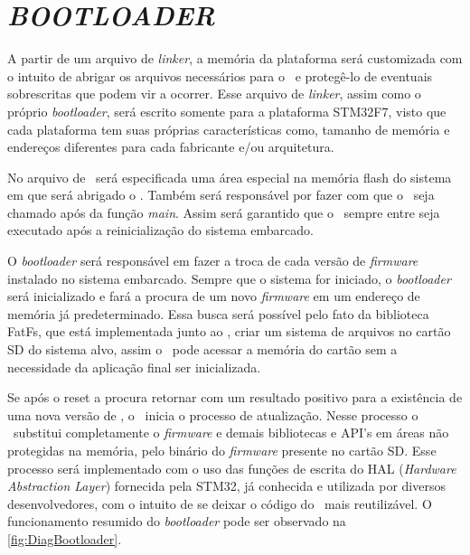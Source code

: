 \section{\textit{BOOTLOADER}}
\label{sec:Bootloader}

A partir de um arquivo de \textit{linker}, a memória da plataforma será customizada com o intuito de abrigar os arquivos necessários para o \bootloader\ e protegê-lo de eventuais sobrescritas que podem vir a ocorrer. Esse arquivo de \textit{linker}, assim como o próprio \textit{bootloader}, será escrito somente para a plataforma STM32F7, visto que cada plataforma tem suas próprias características como, tamanho de memória e endereços diferentes para cada fabricante e/ou arquitetura.

No arquivo de \linker\ será especificada uma área especial na memória flash do sistema em que será abrigado o \bootloader. Também será responsável por fazer com que o \bootloader\ seja chamado após da função \textit{main}. Assim será garantido que o \bootloader\ sempre entre seja executado após a reinicialização do sistema embarcado.


O \textit{bootloader} será responsável em fazer a troca de cada versão de \textit{firmware} instalado no sistema embarcado. Sempre que o sistema for iniciado, o \textit{bootloader} será inicializado e fará a procura de um novo \textit{firmware} em um endereço de memória já predeterminado. Essa busca será possível pelo fato da biblioteca FatFs, que está implementada junto ao \bootloader, criar um sistema de arquivos no cartão SD do sistema alvo, assim o \bootloader\ pode acessar a memória do cartão sem a necessidade da aplicação final ser inicializada.

Se após o reset a procura retornar com um resultado positivo para a existência de uma nova versão de \software, o \bootloader\ inicia o processo de atualização. Nesse processo o \bootloader\ substitui completamente o \textit{firmware} e demais bibliotecas e API's em áreas não protegidas na memória, pelo binário do \textit{firmware} presente no cartão SD. Esse processo será implementado com o uso das funções de escrita do HAL (\textit{Hardware Abstraction Layer}) fornecida pela STM32, já conhecida e utilizada por diversos desenvolvedores, com o intuito de se deixar o código do \bootloader\ mais reutilizável. O funcionamento resumido do \textit{bootloader} pode ser observado na \autoref{fig:DiagBootloader}.

